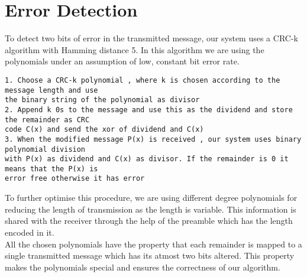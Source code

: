 \documentclass[11pt]{article}
\begin{document}
\section{Error Detection}
To detect two bits of error in the transmitted message, our system uses a CRC-k algorithm with Hamming distance 5. In this algorithm we are using the polynomials under an assumption of low, constant bit error rate.
\begin{tcolorbox}[colback=black!10!white, colframe=black, title=Error Detection Algorithm ]
    \begin{verbatim}
1. Choose a CRC-k polynomial , where k is chosen according to the message length and use
the binary string of the polynomial as divisor
2. Append k 0s to the message and use this as the dividend and store the remainder as CRC 
code C(x) and send the xor of dividend and C(x)
3. When the modified message P(x) is received , our system uses binary polynomial division
with P(x) as dividend and C(x) as divisor. If the remainder is 0 it means that the P(x) is 
error free otherwise it has error\end{verbatim}
\end{tcolorbox}
To further optimise this procedure, we are using different degree polynomials for reducing the length of transmission as the length is variable. This information is shared with the receiver through the help of the preamble which has the length encoded in it. \\
All the chosen polynomials have the property that each remainder is mapped to a single transmitted message which has its atmost two bits altered. This property makes the polynomials special and ensures the correctness of our algorithm.
\end{document}
